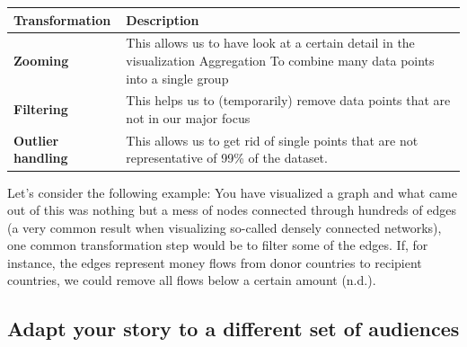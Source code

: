 \documentclass[]{book}
\theoremstyle{definition}
\theoremstyle{definition}
\theoremstyle{definition}
\theoremstyle{remark}
\begin{document}
\begin{longtable}[]{@{}ll@{}}
\toprule
\begin{minipage}[b]{0.16\columnwidth}\raggedright\strut
\textbf{Transformation}\strut
\end{minipage} & \begin{minipage}[b]{0.78\columnwidth}\raggedright\strut
\textbf{Description}\strut
\end{minipage}\tabularnewline
\midrule
\endhead
\begin{minipage}[t]{0.16\columnwidth}\raggedright\strut
\textbf{Zooming}\strut
\end{minipage} & \begin{minipage}[t]{0.78\columnwidth}\raggedright\strut
This allows us to have look at a certain detail in the visualization
Aggregation To combine many data points into a single group\strut
\end{minipage}\tabularnewline
\begin{minipage}[t]{0.16\columnwidth}\raggedright\strut
\textbf{Filtering}\strut
\end{minipage} & \begin{minipage}[t]{0.78\columnwidth}\raggedright\strut
This helps us to (temporarily) remove data points that are not in our
major focus\strut
\end{minipage}\tabularnewline
\begin{minipage}[t]{0.16\columnwidth}\raggedright\strut
\textbf{Outlier handling}\strut
\end{minipage} & \begin{minipage}[t]{0.78\columnwidth}\raggedright\strut
This allows us to get rid of single points that are not representative
of 99\% of the dataset.\strut
\end{minipage}\tabularnewline
\bottomrule
\end{longtable}

Let's consider the following example: You have visualized a graph and
what came out of this was nothing but a mess of nodes connected through
hundreds of edges (a very common result when visualizing so-called
densely connected networks), one common transformation step would be to
filter some of the edges. If, for instance, the edges represent money
flows from donor countries to recipient countries, we could remove all
flows below a certain amount (n.d.).

\subsection{Adapt your story to a different set of
audiences}\label{adapt-your-story-to-a-different-set-of-audiences}
\end{document}
